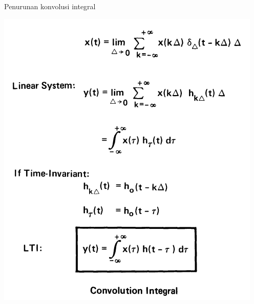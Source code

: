 \documentclass[aspectratio=169]{beamer}
\begin{document}
\begin{frame}{Penurunan konvolusi integral}
	\begin{center}
		\includegraphics[height=0.8\textheight]{gambar/03.konvolusi/fig.4.06}
	\end{center}
\end{frame}
\end{document}
